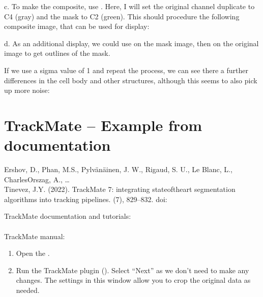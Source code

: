 \documentclass[letterpaper,10pt,english]{jupyterBook}
\begin{document}
\sphinxAtStartPar
c. To make the composite, use . Here, I will set
the original channel duplicate to C4 (gray) and the mask to C2 (green). This
should procedure the following composite image, that can be used for display:

\sphinxAtStartPar
{}

\sphinxAtStartPar
d. As an additional display, we could use  on the mask image,
then  on the original image to get outlines of the mask.

\sphinxAtStartPar
If we use a sigma value of 1 and repeat the process, we can see there a further differences in
the cell body and other structures, although this seems to also pick up more noise:

\sphinxAtStartPar
{}

\sphinxstepscope


\chapter{TrackMate – Example from documentation}
\label{\detokenize{trackmate:trackmate-example-from-documentation}}\label{\detokenize{trackmate::doc}}
\sphinxAtStartPar
Ershov, D., Phan, M.\sphinxhyphen{}S., Pylvänäinen, J. W., Rigaud, S. U., Le Blanc, L., Charles\sphinxhyphen{}Orszag, A., …\\
Tinevez, J.\sphinxhyphen{}Y. (2022). TrackMate 7: integrating state\sphinxhyphen{}of\sphinxhyphen{}the\sphinxhyphen{}art segmentation algorithms into tracking pipelines. (7), 829–832. doi:

\sphinxAtStartPar
TrackMate documentation and tutorials:\\
\\
TrackMate manual:\\

\sphinxAtStartPar
{}
\begin{enumerate}
%
\item {} 
\sphinxAtStartPar
Open the .

\item {} 
\sphinxAtStartPar
Run the TrackMate plugin (). Select “Next” as we don’t need to make any changes. The settings in this window allow you to crop the original data as needed.

\end{enumerate}
\end{document}
